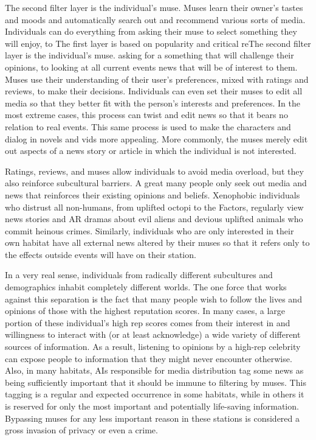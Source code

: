 The second filter layer is the individual's muse. 
Muses learn their owner's tastes and moods and automatically search out and recommend various sorts 
of media. Individuals can do everything from asking 
their muse to select something they will enjoy, to 
The first layer is based on popularity and critical reThe second filter layer is the individual's muse. 
asking for a something that will challenge their opinions, to looking at all current events news that will 
be of interest to them. Muses use their understanding 
of their user's preferences, mixed with ratings and 
reviews, to make their decisions. Individuals can even 
set their muses to edit all media so that they better fit 
with the person's interests and preferences. In the most 
extreme cases, this process can twist and edit news 
so that it bears no relation to real events. This same 
process is used to make the characters and dialog in 
novels and vids more appealing. More commonly, the 
muses merely edit out aspects of a news story or article in which the individual is not interested.

Ratings, reviews, and muses allow individuals 
to avoid media overload, but they also reinforce 
subcultural barriers. A great many people only seek 
out media and news that reinforces their existing 
opinions and beliefs. Xenophobic individuals who 
distrust all non-humans, from uplifted octopi to the 
Factors, regularly view news stories and AR dramas 
about evil aliens and devious uplifted animals who 
commit heinous crimes. Similarly, individuals who are 
only interested in their own habitat have all external 
news altered by their muses so that it refers only to 
the effects outside events will have on their station.

In a very real sense, individuals from radically 
different subcultures and demographics inhabit completely different worlds. The one force that works 
against this separation is the fact that many people 
wish to follow the lives and opinions of those with 
the highest reputation scores. In many cases, a large 
portion of these individual's high rep scores comes 
from their interest in and willingness to interact with 
(or at least acknowledge) a wide variety of different 
sources of information. As a result, listening to opinions by a high-rep celebrity can expose people to information that they might never encounter otherwise. 
Also, in many habitats, AIs responsible for media distribution tag some news as being sufficiently important that it should be immune to filtering by muses. 
This tagging is a regular and expected occurrence 
in some habitats, while in others it is reserved for 
only the most important and potentially life-saving 
information. Bypassing muses for any less important 
reason in these stations is considered a gross invasion of privacy or even a crime.

